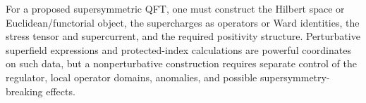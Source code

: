 \begin{openproblem}
\label{op:susy-nonperturbative-realization}
For a proposed supersymmetric QFT, one must construct the Hilbert space or
Euclidean/functorial object, the supercharges as operators or Ward
identities, the stress tensor and supercurrent, and the required positivity
structure.  Perturbative superfield expressions and protected-index
calculations are powerful coordinates on such data, but a nonperturbative
construction requires separate control of the regulator, local operator
domains, anomalies, and possible supersymmetry-breaking effects.
\end{openproblem}
